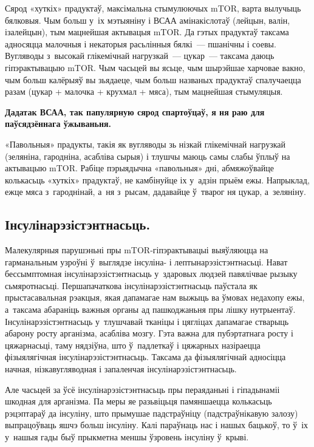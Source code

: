 Сярод «хуткіх» прадуктаў, максімальна стымулюючых mTOR, варта вылучыць бялковыя. Чым больш у~іх мэтыяніну і ВСАА амінакіслотаў (лейцын, валін, ізалейцын), тым мацнейшая актывацыя mTOR. Да гэтых прадуктаў таксама адносяцца малочныя і некаторыя расьлінныя бялкі~--- пшанічны і соевы. Вугляводы з~высокай глікемічнай нагрузкай~--- цукар~--- таксама даюць гіпэрактывацыю mTOR. Чым часьцей вы ясьце, чым шырэйшае харчовае вакно, чым больш калёрыяў вы зьядаеце, чым больш названых прадуктаў спалучаецца разам (цукар + малочка + крухмал + мяса), тым мацнейшая стымуляцыя. 

\textbf{Дадатак ВСАА, так папулярную сярод спартоўцаў, я ня раю для паўсядзённага ўжываньня.}

«Павольныя» прадукты, такія як вугляводы зь нізкай глікемічнай нагрузкай (зеляніна, гародніна, асабліва сырыя) і тлушчы маюць самы слабы ўплыў на актывацыю mTOR. Рабіце пэрыядычна «павольныя» дні, абмяжоўвайце колькасьць «хуткіх» прадуктаў, не камбінуйце іх у~адзін прыём ежы. Напрыклад, ежце мяса з~гароднінай, а~ня з~рысам, дадавайце ў~тварог ня цукар, а~зеляніну. 


\subsection*{Інсулінарэзістэнтнасьць.}

Малекулярныя парушэньні пры mTOR-гіпэрактывацыі выяўляюцца на гарманальным узроўні ў~выглядзе інсуліна- і лептынарэзістэнтнасьці. Нават бессымптомная інсулінарэзістэнтнасьць у~здаровых людзей павялічвае рызыку сьмяротнасьці. Першапачаткова інсулінарэзістэнтнасьць паўстала як прыстасавальная рэакцыя, якая дапамагае нам выжыць ва ўмовах недахопу ежы, а~таксама абараніць важныя органы ад пашкоджаньня пры лішку нутрыентаў. Інсулінарэзістэнтнасьць у~тлушчавай тканіцы і цягліцах дапамагае стварыць абарону росту арганізма, асабліва мозгу. Гэта важна для пубэртатнага росту і цяжарнасьці, таму нядзіўна, што ў~падлеткаў і цяжарных назіраецца фізыялягічная інсулінарэзістэнтнасьць. Таксама да фізыялягічнай адносіцца начная, нізкавугляводная і запаленчая інсулінарэзістэнтнасьць.

Але часьцей за ўсё інсулінарэзістэнтнасьць пры пераяданьні і гіпадынаміі шкодная для арганізма. Па меры яе разьвіцьця памяншаецца колькасьць рэцэптараў да інсуліну, што прымушае падстраўніцу (падстраўнікавую залозу) выпрацоўваць яшчэ больш інсуліну. Калі параўнаць нас і нашых бацькоў, то ў~іх у~нашыя гады быў прыкметна меншы ўзровень інсуліну ў~крыві.

